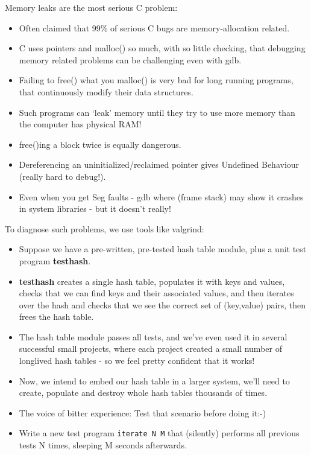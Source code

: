 \documentclass[aspectratio=169]{beamer}
\newcommand{\pitem}{\pause \item}
\begin{document}
\begin{frame}[fragile]
    Memory leaks are the most serious C problem:
    \begin{itemize}
      \item
      Often claimed that
      \alert{99\% of serious C bugs are memory-allocation related}.
      \item
      C uses \alert{pointers and malloc()} so much, with
      so little checking, that debugging memory related
      problems can be challenging even with gdb.
    \pause
      \item
      Failing to \alert{free() what you malloc()} is
      very bad for long running programs, that
      continuously \alert{modify their data structures}.
    \pause
      \item
      Such programs can `leak' memory until they try to use more memory than
      the computer has physical RAM!
    \pause
      \item
      \alert{free()ing a block twice} is equally dangerous.
    \pause
      \item
      \alert{Dereferencing} an uninitialized/reclaimed pointer
      gives \alert{Undefined Behaviour} (really hard to debug!).
    \pause
      \item
      Even when you get \alert{Seg faults} - \alert{gdb where} (frame stack)
      may show it crashes in system libraries - but it doesn't really!
    \end{itemize}
    To diagnose such problems, we use tools like \alert{valgrind}:
\end{frame}

\begin{frame}[fragile]
    \begin{itemize}
    \item
      Suppose we have a \alert{pre-written, pre-tested}
      hash table module, plus a unit test program {\bf testhash}.
    \pitem
      {\bf testhash} creates a single hash table, populates it with keys and values,
      checks that we can find keys and their associated values, and
      then iterates over the hash and checks that we see the correct
      set of (key,value) pairs, then frees the hash table.
    \pitem
      The hash table module \alert{passes all tests}, and
      we've even used it in several successful small projects,
      where each project created a small number of \alert{longlived} hash tables
      - so we feel pretty confident that it works!
    \pitem
      Now, we intend to embed our hash table in a larger system,
      we'll need to create, populate and destroy whole hash tables
      \alert{thousands of times}.
    \pitem
      The voice of bitter experience: \alert{Test that scenario} before doing it:-)
    \pause
    \item
      Write a new test program \verb+iterate N M+ that (silently)
      performs all previous tests N times, sleeping M seconds afterwards.
    \end{itemize}
\end{frame}
\end{document}
